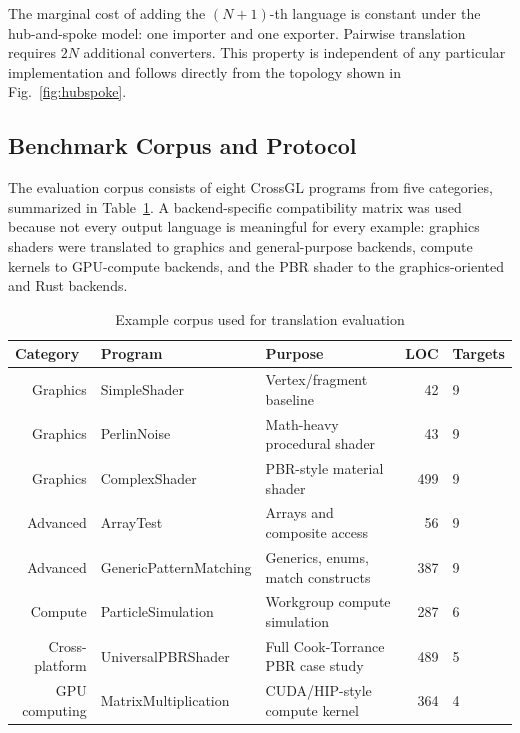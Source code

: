 \documentclass{svproc}
\begin{document}
The marginal cost of adding the $(N+1)$-th language is constant under the hub-and-spoke model: one importer and one exporter. Pairwise translation requires $2N$ additional converters. This property is independent of any particular implementation and follows directly from the topology shown in Fig.~\ref{fig:hubspoke}.

\subsection{Benchmark Corpus and Protocol}

The evaluation corpus consists of eight CrossGL programs from five categories, summarized in Table~\ref{tab:corpus}. A backend-specific compatibility matrix was used because not every output language is meaningful for every example: graphics shaders were translated to graphics and general-purpose backends, compute kernels to GPU-compute backends, and the PBR shader to the graphics-oriented and Rust backends.

\begin{table}
\caption{Example corpus used for translation evaluation}
\label{tab:corpus}
\begin{center}
\scriptsize
\begin{tabular}{r@{\quad}llrl}
\hline
\multicolumn{1}{l}{\rule{0pt}{12pt}\textbf{Category}} & \textbf{Program} & \textbf{Purpose} & \textbf{LOC} & \textbf{Targets} \\[2pt]
\hline\rule{0pt}{12pt}
Graphics & SimpleShader & Vertex/fragment baseline & 42 & 9 \\
Graphics & PerlinNoise & Math-heavy procedural shader & 43 & 9 \\
Graphics & ComplexShader & PBR-style material shader & 499 & 9 \\
Advanced & ArrayTest & Arrays and composite access & 56 & 9 \\
Advanced & GenericPatternMatching & Generics, enums, match constructs & 387 & 9 \\
Compute & ParticleSimulation & Workgroup compute simulation & 287 & 6 \\
Cross-platform & UniversalPBRShader & Full Cook-Torrance PBR case study & 489 & 5 \\
GPU computing & MatrixMultiplication & CUDA/HIP-style compute kernel & 364 & 4 \\[2pt]
\hline
\end{tabular}
\end{center}
\end{table}
\end{document}
